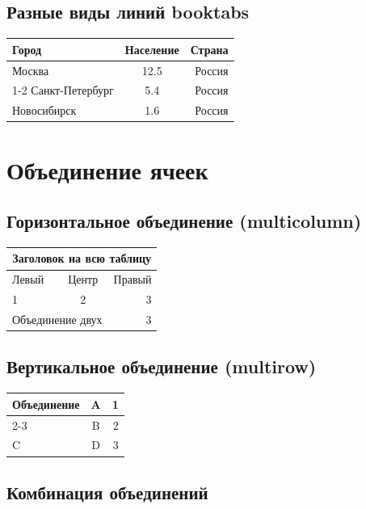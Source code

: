 \documentclass[a4paper,12pt]{article}
\begin{document}
\subsection{Разные виды линий booktabs}

\begin{tabular}{lcr}
  \toprule[2pt]
  Город & Население & Страна \\
  \midrule[1pt]
  Москва & 12.5 & Россия \\
  \cmidrule{1-2}
  Санкт-Петербург & 5.4 & Россия \\
  \addlinespace
  Новосибирск & 1.6 & Россия \\
  \bottomrule[2pt]
\end{tabular}

\section{Объединение ячеек}

\subsection{Горизонтальное объединение (multicolumn)}

\begin{tabular}{|l|c|r|}
  \hline
  \multicolumn{3}{|c|}{Заголовок на всю таблицу} \\
  \hline
  Левый & Центр & Правый \\
  \hline
  1 & 2 & 3 \\
  \hline
  \multicolumn{2}{|c|}{Объединение двух} & 3 \\
  \hline
\end{tabular}

\subsection{Вертикальное объединение (multirow)}

\begin{tabular}{|l|c|r|}
  \hline
  \multirow{2}{*}{Объединение} & A & 1 \\
  \cline{2-3}
  & B & 2 \\
  \hline
  C & D & 3 \\
  \hline
\end{tabular}

\subsection{Комбинация объединений}
\end{document}
